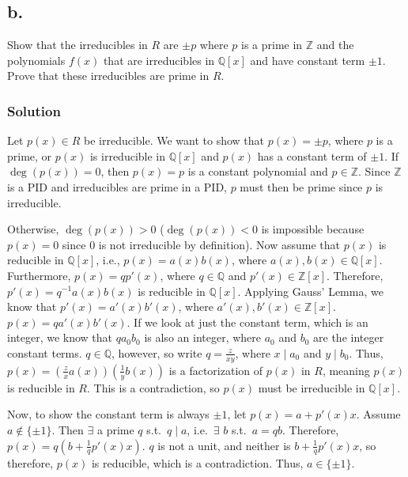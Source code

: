 \documentclass[fleqn]{article}
\begin{document}
        \subsection{b.}
        Show that the irreducibles in $R$ are $\pm p$ where $p$ is a prime in $\mathbb{Z}$ and the polynomials $f(x)$ that are irreducibles in $\mathbb{Q}[x]$ and have constant term $\pm 1$.  Prove that these irreducibles are prime in $R$.
            
            \subsubsection{Solution}
            Let $p(x) \in R$ be irreducible.  We want to show that $p(x) = \pm p$, where $p$ is a prime, or $p(x)$ is irreducible in $\mathbb{Q}[x]$ and $p(x)$ has a constant term of $\pm 1$.  If $\deg(p(x)) = 0$, then $p(x) = p$ is a constant polynomial and $p \in \mathbb{Z}$.  Since $\mathbb{Z}$ is a PID and irreducibles are prime in a PID, $p$ must then be prime since $p$ is irreducible.
            
            Otherwise, $\deg(p(x)) > 0$ ($\deg(p(x)) < 0$ is impossible because $p(x) = 0$ since $0$ is not irreducible by definition).  Now assume that $p(x)$ is reducible in $\mathbb{Q}[x]$, i.e., $p(x) = a(x)b(x)$, where $a(x), b(x) \in \mathbb{Q}[x]$.  Furthermore, $p(x) = q p'(x)$, where $q \in \mathbb{Q}$ and $p'(x) \in \mathbb{Z}[x]$.  Therefore, $p'(x) = q^{-1} a(x)b(x)$ is reducible in $\mathbb{Q}[x]$.  Applying Gauss' Lemma, we know that $p'(x) = a'(x) b'(x)$, where $a'(x), b'(x) \in \mathbb{Z}[x]$.  $p(x) = q a'(x) b'(x)$.  If we look at just the constant term, which is an integer, we know that $q a_0 b_0$ is also an integer, where $a_0$ and $b_0$ are the integer constant terms.  $q \in \mathbb{Q}$, however, so write $q = \frac{z}{xy}$, where $x \mid a_0$ and $y \mid b_0$.  Thus, $p(x) = \left(\frac{z}{x} a(x)\right)\left(\frac{1}{y} b(x)\right)$ is a factorization of $p(x)$ in $R$, meaning $p(x)$ is reducible in $R$.  This is a contradiction, so $p(x)$ must be irreducible in $\mathbb{Q}[x]$.
            
            Now, to show the constant term is always $\pm 1$, let $p(x) = a + p'(x) x$.  Assume $a \notin \{\pm 1\}$.  Then $\exists$ a prime $q$ s.t.\ $q \mid a$, i.e.\ $\exists$ $b$ s.t.\ $a = qb$.  Therefore, $p(x) = q\left(b + \frac{1}{q} p'(x) x\right)$.  $q$ is not a unit, and neither is $b + \frac{1}{q} p'(x) x$, so therefore, $p(x)$ is reducible, which is a contradiction.  Thus, $a \in \{\pm 1\}$.
        
\end{document}
